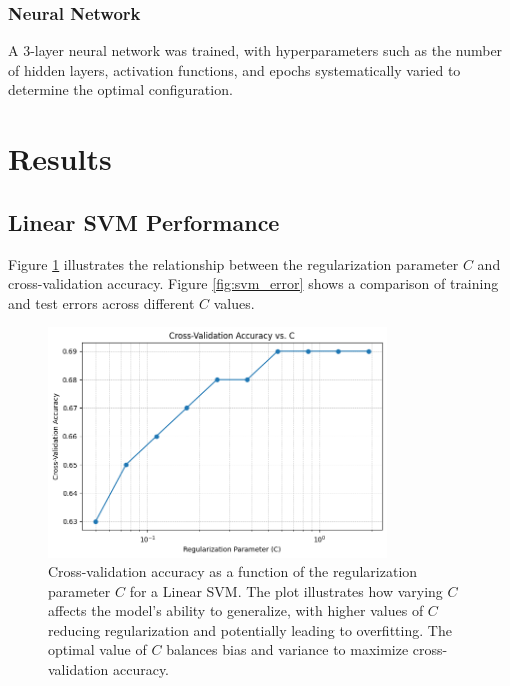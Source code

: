 \documentclass{article}
\begin{document}
\subsubsection{Neural Network}
A 3-layer neural network was trained, with hyperparameters such as the number of hidden layers, activation functions, and epochs systematically varied to determine the optimal configuration.

\section{Results}

\subsection{Linear SVM Performance}
Figure \ref{fig:svm_c} illustrates the relationship between the regularization parameter $C$ and cross-validation accuracy. Figure \ref{fig:svm_error} shows a comparison of training and test errors across different $C$ values.

\begin{figure}[H]
    \centering
    \includegraphics[width=0.8\textwidth]{crossval_accuracy_C.png}
    \caption{Cross-validation accuracy as a function of the regularization parameter $C$ for a Linear SVM. The plot illustrates how varying $C$ affects the model's ability to generalize, with higher values of $C$ reducing regularization and potentially leading to overfitting. The optimal value of $C$ balances bias and variance to maximize cross-validation accuracy.}
    \label{fig:svm_c}
\end{figure}
\end{document}
